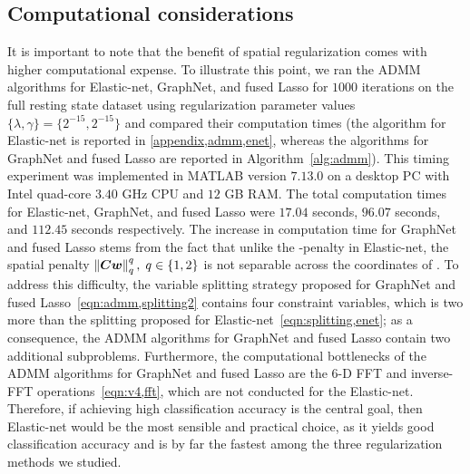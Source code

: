 \subsection{Computational considerations}
It is important to note that the benefit of spatial regularization comes with higher computational expense.
To illustrate this point, we ran the ADMM algorithms for Elastic-net, GraphNet, and fused Lasso for $1000$ iterations on the full resting state dataset using regularization parameter values $\{\lambda,\gamma\}=\{2^{-15},2^{-15}\}$ and compared their computation times
(the algorithm for Elastic-net is reported in \ref{appendix,admm,enet}, whereas the algorithms for GraphNet and fused Lasso are reported in Algorithm~\ref{alg:admm}).
This timing experiment was implemented in MATLAB version $7.13.0$ on a desktop PC with Intel quad-core $3.40$ GHz CPU and $12$ GB RAM.
The total computation times for Elastic-net, GraphNet, and fused Lasso were $17.04$ seconds, $96.07$ seconds, and $112.45$ seconds respectively.
The increase in computation time for GraphNet and fused Lasso stems from the fact that unlike the \elltwo-penalty in Elastic-net, the spatial penalty $\left\| {\bm{C}}{\bm{w}} \right\|_q^q,\; {q\in\{1,2\}}$ is not separable across the coordinates of \w.
To address this difficulty, the variable splitting strategy proposed for GraphNet and fused Lasso~\eqref{eqn:admm,splitting2} contains four constraint variables, which is two more than the splitting proposed for Elastic-net~\eqref{eqn:splitting,enet}; as a consequence, the ADMM algorithms for GraphNet and fused Lasso contain two additional subproblems.
Furthermore, the computational bottlenecks of the ADMM algorithms for GraphNet and fused Lasso are the $6$-D FFT and inverse-FFT operations~\eqref{eqn:v4,fft}, which are not conducted for the Elastic-net.
Therefore, if achieving high classification accuracy is the central goal, then Elastic-net would be the most sensible and practical choice, as it yields good classification accuracy and is by far the fastest among the three regularization methods we studied.

